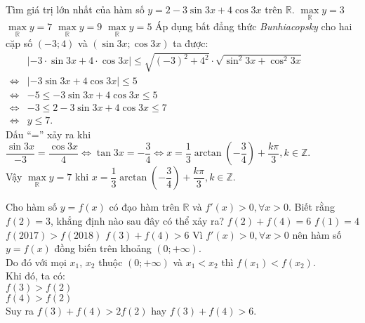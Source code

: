 \begin{ex}%
 Tìm giá trị lớn nhất của hàm số $y = 2 - 3\sin 3x + 4\cos 3x$ trên $\mathbb{R}$.
 \choice
  {$\max\limits_{\mathbb{R}} y = 3$}
  {\True $\max\limits_{\mathbb{R}} y = 7$}
  {$\max\limits_{\mathbb{R}} y = 9$}
  {$\max\limits_{\mathbb{R}} y = 5$}
 \loigiai
  {
  Áp dụng bất đẳng thức \textit{Bunhiacopsky} cho hai cặp số $(-3;4)$ và $(\sin3x; \cos3x)$ ta được:\\
  $\begin{array}{ll}
  				   & |-3 \cdot \sin3x + 4 \cdot \cos3x| \leq \sqrt{(-3)^2 + 4^2} \cdot \sqrt{\sin^2 3x + \cos^2 3x}\\
   \Leftrightarrow & |-3 \sin3x + 4 \cos3x| \leq 5\\
   \Leftrightarrow & -5 \leq -3 \sin3x + 4 \cos3x \leq 5\\
   \Leftrightarrow & -3 \leq 2 -3 \sin3x + 4 \cos3x \leq 7\\
   \Leftrightarrow & y \leq 7.
  \end{array}$\\
  Dấu ``='' xảy ra khi $\dfrac{\sin3x}{-3} = \dfrac{\cos3x}{4} \Leftrightarrow \tan3x = -\dfrac{3}{4} \Leftrightarrow x = \dfrac{1}{3}\arctan\left(-\dfrac{3}{4}\right) + \dfrac{k\pi}{3}, k \in \mathbb{Z}$.\\
  Vậy $\max\limits_{\mathbb{R}} y = 7$ khi $x = \dfrac{1}{3}\arctan\left(-\dfrac{3}{4}\right) + \dfrac{k\pi}{3}, k \in \mathbb{Z}$.
  }
\end{ex}


\begin{ex}%
 Cho hàm số $y = f(x)$ có đạo hàm trên $\mathbb{R}$ và $f'(x)>0, \forall x >0$. Biết rằng $f(2) = 3$, khẳng định nào sau đây có thể xảy ra?
 \choice
  {$f(2)+f(4)=6$}
  {$f(1)=4$}
  {$f(2017) > f(2018)$}
  {\True $f(3) + f(4) > 6$}
 \loigiai
  {
  Vì $f'(x) > 0, \forall x > 0$ nên hàm số $y = f(x)$ đồng biến trên khoảng $(0;+\infty)$.\\
  Do đó với mọi $x_1$, $x_2$ thuộc $(0;+\infty)$ và $x_1 < x_2$ thì $f(x_1) < f(x_2)$.\\
  Khi đó, ta có:\\
  \hspace*{1.5cm}$f(3) > f(2)$\\
  \hspace*{1.5cm}$f(4) > f(2)$\\
  Suy ra $f(3) + f(4) > 2f(2)$ hay $f(3) + f(4) > 6$.
  }
\end{ex}


